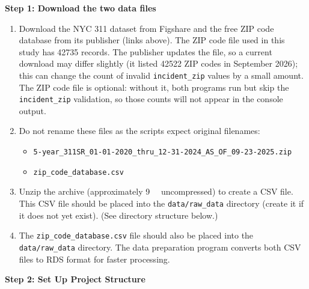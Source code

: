 \documentclass[linenumber]{jdsart}
\begin{document}
\medskip\noindent\textbf{Step 1: Download the two data files}


\begin{enumerate}
\item Download the NYC 311 dataset from Figshare and the free ZIP code database
from its publisher (links above). The ZIP code file used in this study has
\num{42735} records. The publisher updates the file, so a current download may
differ slightly (it listed \num{42522} ZIP codes in September 2026); this can
change the count of invalid \texttt{incident\_zip} values by a small amount.
The ZIP code file is optional: without it, both programs run but skip the
\texttt{incident\_zip} validation, so those counts will not appear in the
console output.
\item Do not rename these files as the scripts expect original filenames:


\begin{itemize}
\item \texttt{5-year\_311SR\_01-01-2020\_thru\_12-31-2024\_AS\_OF\_09-23-2025.zip}
\item \texttt{zip\_code\_database.csv}
\end{itemize}


\item Unzip the archive (approximately \SI{9}{\giga\byte} uncompressed) to create a CSV file.
This CSV file should be placed into the \texttt{data/raw\_data} directory
(create it if it does not yet exist). 
(See directory structure below.)
\item The \texttt{zip\_code\_database.csv} file should also be placed into the 
\texttt{data/raw\_data} directory. The data preparation program converts both
CSV files to RDS format for faster processing.
\end{enumerate}


\medskip\noindent\textbf{Step 2: Set Up Project Structure}
\end{document}
